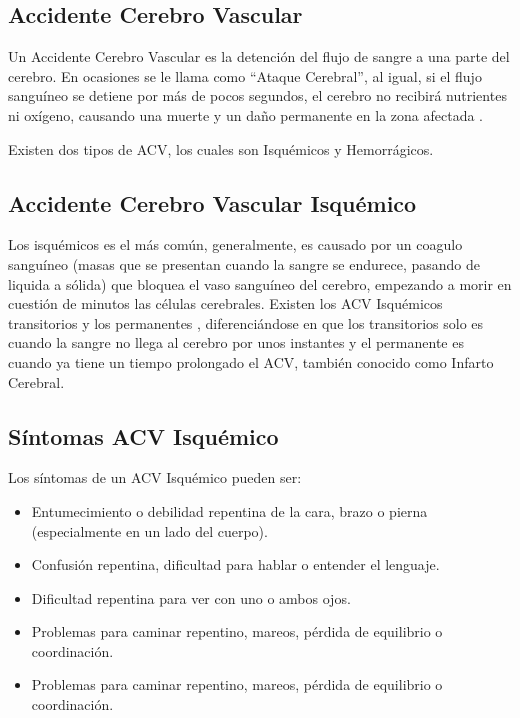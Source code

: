 \doublespacing
\subsection{Accidente Cerebro Vascular}
\par Un Accidente Cerebro Vascular es la detención del flujo de sangre a una parte del cerebro. En ocasiones se le llama como “Ataque Cerebral”, al igual, si el flujo sanguíneo se detiene por más de pocos segundos, el cerebro no recibirá nutrientes ni oxígeno, causando una muerte y un daño permanente en la zona afectada \cite{Garcia2019}.
\par Existen dos tipos de ACV, los cuales son Isquémicos y Hemorrágicos.\\

\doublespacing
\subsection{Accidente Cerebro Vascular Isquémico}
\par Los isquémicos es el más común, generalmente, es causado por un coagulo sanguíneo (masas que se presentan cuando la sangre se endurece, pasando de liquida a sólida) que bloquea el vaso sanguíneo del cerebro, empezando a morir en cuestión de minutos las células cerebrales. Existen los ACV Isquémicos transitorios y los permanentes \cite{Garcia2019}, diferenciándose en que los transitorios solo es cuando la sangre no llega al cerebro por unos instantes y el permanente es cuando ya tiene un tiempo prolongado el ACV, también conocido como Infarto Cerebral.\\

\doublespacing
\subsection{Síntomas ACV Isquémico}
\par Los síntomas de un ACV Isquémico pueden ser:
	\begin{itemize}
		\item Entumecimiento o debilidad repentina de la cara, brazo o pierna (especialmente en un lado del cuerpo).
		\item Confusión repentina, dificultad para hablar o entender el lenguaje.
		\item Dificultad repentina para ver con uno o ambos ojos.
		\item Problemas para caminar repentino, mareos, pérdida de equilibrio o coordinación.
		\item Problemas para caminar repentino, mareos, pérdida de equilibrio o coordinación.\\
	\end{itemize}
	
